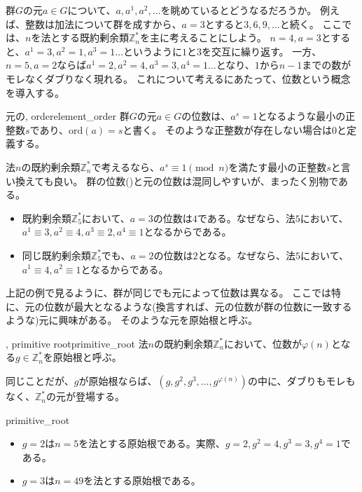 群$G$の元$a\in G$について、$a, a^1, a^2,\ldots$を眺めているとどうなるだろうか。
例えば、整数は加法について群を成すから、$a=3$とすると$3,6,9,\ldots$と続く。
ここでは、$n$を法とする既約剰余類$\mathbb{Z}_n^*$を主に考えることにしよう。
$n=4,a=3$とすると、$a^1=3,a^2=1,a^3=1\ldots$というように$1$と$3$を交互に繰り返す。
一方、$n=5,a=2$ならば$a^1=2,a^2=4,a^3=3,a^4=1\ldots$となり、$1$から$n-1$までの数がモレなくダブりなく現れる。
これについて考えるにあたって、位数という概念を導入する。

\begin{Defi}{元の, order}{element_order}
群$G$の元$a\in G$の位数は、$a^s = 1$となるような最小の正整数$s$であり、$\mbox{ord}(a)=s$と書く。
そのような正整数が存在しない場合は$0$と定義する。
\end{Defi}

法$n$の既約剰余類$\mathbb{Z}_n^*$で考えるなら、$a^s \equiv 1 \pmod{n}$を満たす最小の正整数$s$と言い換えても良い。
群の位数()と元の位数は混同しやすいが、まったく別物である。

\begin{itemize}
 \item 既約剰余類$\mathbb{Z}_{5}^*$において、$a=3$の位数は$4$である。なぜなら、法$5$において、$a^1\equiv3,a^2\equiv4,a^3\equiv2,a^4\equiv1$となるからである。
 \item 同じ既約剰余類$\mathbb{Z}_{5}^*$でも、$a=2$の位数は$2$となる。なぜなら、法$5$において、$a^1\equiv4,a^2\equiv1$となるからである。
\end{itemize}

上記の例で見るように、群が同じでも元によって位数は異なる。
ここでは特に、元の位数が最大となるような(換言すれば、元の位数が群の位数に一致するような)元に興味がある。
そのような元を原始根と呼ぶ。

\begin{Defi}{, primitive root}{primitive_root}
法$n$の既約剰余類$\mathbb{Z}_n^*$において、位数が$\varphi(n)$となる$g\in\mathbb{Z}_n^*$を原始根と呼ぶ。
\end{Defi}

同じことだが、$g$が原始根ならば、$(g,g^2,g^3,\ldots,g^{\varphi(n)})$の中に、ダブりもモレもなく、$\mathbb{Z}_n^*$の元が登場する。
\begin{Exam}{}{primitive_root}\;
\begin{itemize}
 \item $g=2$は$n=5$を法とする原始根である。実際、$g=2,g^2=4,g^3=3,g^4=1$である。
 \item $g=3$は$n=49$を法とする原始根である。
\end{itemize}
\end{Exam}

